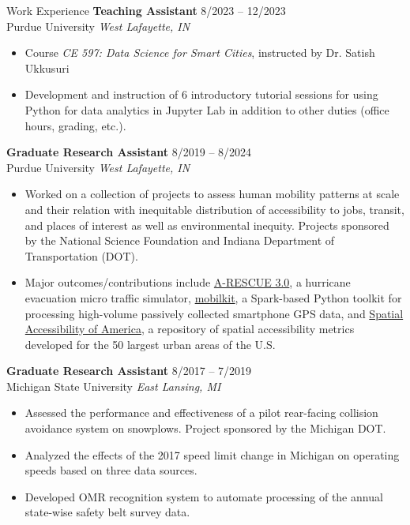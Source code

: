 \documentclass{CV} %
\begin{document}
\begin{rSection}{Work Experience}
    {\bf Teaching Assistant} \hfill {8/2023 – 12/2023}
    \\ Purdue University \hfill {\em West Lafayette, IN}
    \begin{itemize}[noitemsep]
        \item Course {\em CE 597: Data Science for Smart Cities}, instructed by Dr. Satish Ukkusuri
        \item Development and instruction of 6 introductory tutorial sessions for using Python for data analytics in Jupyter Lab in addition to other duties (office hours, grading, etc.).
    \end{itemize}
    {\bf Graduate Research Assistant} \hfill {8/2019 – 8/2024}
    \\ Purdue University \hfill {\em West Lafayette, IN}
    \begin{itemize}[noitemsep]
        \item Worked on a collection of projects to assess human mobility patterns at scale and their relation with inequitable distribution of accessibility to jobs, transit, and places of interest as well as environmental inequity. Projects sponsored by the National Science Foundation and Indiana Department of Transportation (DOT).
        \item Major outcomes/contributions include \href{https://umnilab.github.io/HSEES_doc/}{A-RESCUE 3.0}, a hurricane evacuation micro traffic simulator, \href{https://github.com/rvanxer/mk}{mobilkit}, a Spark-based Python toolkit for processing high-volume passively collected smartphone GPS data, and \href{https://github.com/rvanxer/spr_4711}{Spatial Accessibility of America}, a repository of spatial accessibility metrics developed for the 50 largest urban areas of the U.S.
    \end{itemize}
    {\bf Graduate Research Assistant} \hfill {8/2017 – 7/2019}
    \\ Michigan State University \hfill {\em East Lansing, MI}
    \begin{itemize}[noitemsep]
        \item Assessed the performance and effectiveness of a pilot rear-facing collision avoidance system on snowplows. Project sponsored by the Michigan DOT.
        \item Analyzed the effects of the 2017 speed limit change in Michigan on operating speeds based on three data sources.
        \item Developed OMR recognition system to automate processing of the annual state-wise safety belt survey data.

\end{itemize}
\end{rSection}
\end{document}
